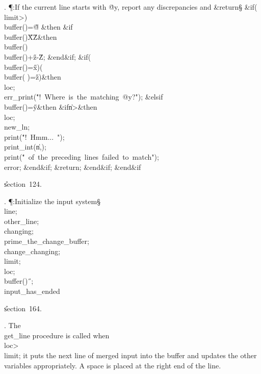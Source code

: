 . \P\?:If the current line starts with \.{@y}, report any
discrepancies and \&{return}\X\S\?\6
\&{if}\1\1\?\8\1(\?\\{limit}\?>\?\2)\ANT\?\\{buffer}\?\1(\?\2)=\?\H{@}\2%
\8\&{then}\6
\&{if}\1\1\8\\{buffer}\?\1(\?\2)\in\?\H{X}\?\to\?\H{Z}\2\8\&{then}\6
\\{buffer}\?\1(\?\2)\K\?\\{buffer}\?\1(\?\2)+\?\H{z}\?-\?\H{Z};%
\2\6
\&{end}\8\2\&{if}\1;\6
\&{if}\1\1\?\8\1(\?\\{buffer}\?\1(\?\2)=\?\H{x}\?\2)\V\1(\?\\{buffer}\?\1(%
\?\2)=\?\H{z}\?\2)\?\2\8\&{then}\6
\\{loc}\?\K{};\5
\\{err\_print}\?\1(\?\.{"!\ Where\ is\ the\ matching\ @y?"}\?\2)\?;\6
\4\&{elsif}\1\8\\{buffer}\?\1(\?\2)=\?\H{y}\2\8\&{then}\6
\&{if}\1\1\8\|n\?>\2\8\&{then}\6
\\{loc}\?\K{};\5
\\{new\_ln};\5
\\{print}\?\1(\?\.{"!\ Hmm...\ "}\?\2)\?;\5
\\{print\_int}\?\1(\?\|n\?,\?\2)\?;\5
\\{print}\?\1(\?\.{"\ of\ the\ preceding\ lines\ failed\ to\ match"}\?\2)\?;\5
\\{error};\2\6
\&{end}\8\2\&{if}\1;\6
\&{return};\2\6
\&{end}\8\2\&{if}\1;\2\6
\&{end}\8\2\&{if}\1\par
\U section~124.\fi

. \P\?:Initialize the input system\X\S\?\6
\\{line}\?\K{};\5
\\{other\_line}\?\K{};\6
\\{changing}\?\K\?;\5
\\{prime\_the\_change\_buffer};\5
\\{change\_changing};\6
\\{limit}\?\K{};\5
\\{loc}\?\K{};\5
\\{buffer}\?\1(\?\2)\K\?\H{\ };\5
\\{input\_has\_ended}\?\K\?\par
\U section~164.\fi

. The \\{get\_line} procedure is called when \\{loc}\?>\?\\{limit}; it
puts the next
line of merged input into the buffer and updates the other variables
appropriately. A space is placed at the right end of the line.

